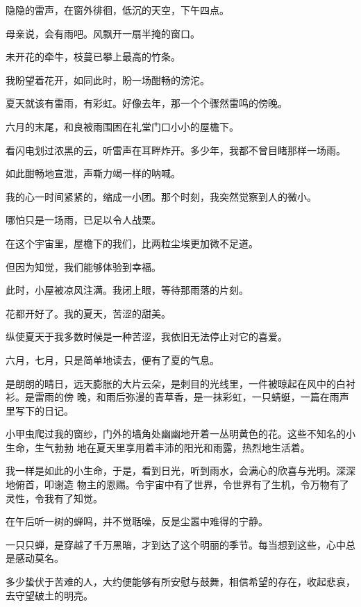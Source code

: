 	\endlongpoem
	\endwriting



		隐隐的雷声，在窗外徘徊，低沉的天空，下午四点。

		母亲说，会有雨吧。风飘开一扇半掩的窗口。

		未开花的牵牛，枝蔓已攀上最高的竹条。

		我盼望着花开，如同此时，盼一场酣畅的滂沱。

		夏天就该有雷雨，有彩虹。好像去年，那一个个骤然雷鸣的傍晚。

		六月的末尾，和良被雨围困在礼堂门口小小的屋檐下。

		看闪电划过浓黑的云，听雷声在耳畔炸开。多少年，我都不曾目睹那样一场雨。

		如此酣畅地宣泄，声嘶力竭一样的呐喊。

		我的心一时间紧紧的，缩成一小团。那个时刻，我突然觉察到人的微小。

		哪怕只是一场雨，已足以令人战栗。

		在这个宇宙里，屋檐下的我们，比两粒尘埃更加微不足道。

		但因为知觉，我们能够体验到幸福。

		此时，小屋被凉风注满。我闭上眼，等待那雨落的片刻。

	\endwriting



		花都开好了。我的夏天，苦涩的甜美。


		\vspace{1em}
		纵使夏天于我多数时候是一种苦涩，我依旧无法停止对它的喜爱。

		六月，七月，只是简单地读去，便有了夏的气息。

		是朗朗的晴日，远天膨胀的大片云朵，是刺目的光线里，一件被晾起在风中的白衬衫。是雷雨的傍
	晚，和雨后弥漫的青草香，是一抹彩虹，一只蜻蜓，一篇在雨声里写下的日记。

		小甲虫爬过我的窗纱，门外的墙角处幽幽地开着一丛明黄色的花。这些不知名的小生命，生气勃勃
	地在夏天里享用着丰沛的阳光和雨露，热烈地生活着。

		我一样是如此的小生命，于是，看到日光，听到雨水，会满心的欣喜与光明。深深地俯首，叩谢造
	物主的恩赐。令宇宙中有了世界，令世界有了生机，令万物有了灵性，令我有了知觉。

		在午后听一树的蝉鸣，并不觉聒噪，反是尘嚣中难得的宁静。\par
		一只只蝉，是穿越了千万黑暗，才到达了这个明丽的季节。每当想到这些，心中总是感动莫名。\par
		多少蛰伏于苦难的人，大约便能够有所安慰与鼓舞，相信希望的存在，收起悲哀，去守望破土的明亮。

